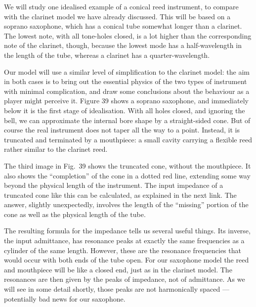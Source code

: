   We will study one idealised example of a conical reed instrument, to compare 
  with the clarinet model we have already discussed. This will be based on a 
  soprano saxophone, which has a conical tube somewhat longer than a clarinet. 
  The lowest note, with all tone-holes closed, is a lot higher than the 
  corresponding note of the clarinet, though, because the lowest mode has a 
  half-wavelength in the length of the tube, whereas a clarinet has a 
  quarter-wavelength. 

  Our model will use a similar level of simplification to the clarinet model: 
  the aim in both cases is to bring out the essential physics of the two types 
  of instrument with minimal complication, and draw some conclusions about the 
  behaviour as a player might perceive it. Figure 39 shows a soprano saxophone, 
  and immediately below it is the first stage of idealisation. With all holes 
  closed, and ignoring the bell, we can approximate the internal bore shape by 
  a straight-sided cone. But of course the real instrument does not taper all 
  the way to a point. Instead, it is truncated and terminated by a mouthpiece: 
  a small cavity carrying a flexible reed rather similar to the clarinet reed. 


  The third image in Fig.\ 39 shows the truncated cone, without the mouthpiece. 
  It also shows the “completion” of the cone in a dotted red line, extending 
  some way beyond the physical length of the instrument. The input impedance of 
  a truncated cone like this can be calculated, as explained in the next link. 
  The answer, slightly unexpectedly, involves the length of the “missing” 
  portion of the cone as well as the physical length of the tube. 

  The resulting formula for the impedance tells us several useful things. Its 
  inverse, the input admittance, has resonance peaks at exactly the same 
  frequencies as a cylinder of the same length. However, these are the 
  resonance frequencies that would occur with both ends of the tube open. For 
  our saxophone model the reed and mouthpiece will be like a closed end, just 
  as in the clarinet model. The resonances are then given by the peaks of 
  impedance, not of admittance. As we will see in some detail shortly, those 
  peaks are not harmonically spaced — potentially bad news for our saxophone. 


